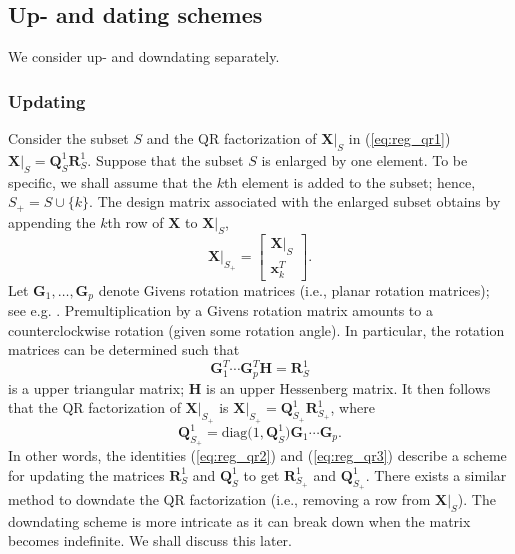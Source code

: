 \documentclass[a4paper,oneside,11pt,DIV=12]{scrartcl}
\begin{document}
\subsection{Up- and dating schemes}
We consider up- and downdating separately.

\subsubsection{Updating}

Consider the subset $S$ and the QR factorization of $\bm X \vert_S$ in (\ref{eq:reg_qr1}) $\bm X \vert_S = \bm Q_S^1 \bm R_S^1$. Suppose that the subset $S$ is enlarged by one element. To be specific, we shall assume that the $k$th element is added to the subset; hence, $S_{+} = S \cup \{k\}$. The design matrix associated with the enlarged subset obtains by appending the $k$th row of $\bm X$ to $\bm X \vert_S$, 
\begin{equation*}
	\bm X\vert_{S_+} = \left[\begin{matrix}
		\bm X\vert_{S} \\ \bm x_k^T 
	\end{matrix}\right].
\end{equation*}
\noindent Let $\bm G_1, \ldots, \bm G_p$ denote Givens rotation matrices (i.e., planar rotation matrices); see e.g. \citet[][Chap. 5.1.8]{golub_loan_1996}. Premultiplication by a Givens rotation matrix amounts to a counterclockwise rotation (given some rotation angle). In particular, the rotation matrices can be determined such that
\begin{equation}\label{eq:reg_qr2}
	\bm G_1^T \cdots \bm G_p^T \bm H = \bm R_{S}^1
\end{equation}
\noindent is a upper triangular matrix; $\bm H$ is an upper Hessenberg matrix. It then follows that \citep[][Chap. 12.5.3]{golub_loan_1996} the QR factorization of $\bm X\vert_{S_+}$ is $\bm X\vert_{S_+} = \bm Q_{S_+}^1 \bm R_{S_+}^1$, where 
\begin{equation}\label{eq:reg_qr3}
	\bm Q_{S_+}^1 = \mathrm{diag}\big(1, \bm Q_{S}^1\big) \bm G_1 \cdots \bm G_p.
\end{equation}
\noindent In other words, the identities (\ref{eq:reg_qr2}) and (\ref{eq:reg_qr3}) describe a scheme for updating the matrices $\bm R_S^1$ and $\bm Q_S^1$ to get $\bm R_{S_+}^1$ and $\bm Q_{S_+}^1$. There exists a similar method to downdate the QR factorization (i.e., removing a row from $\bm X \vert_S$). The downdating scheme is more intricate as it can break down when the matrix becomes indefinite. We shall discuss this later.  
\end{document}
